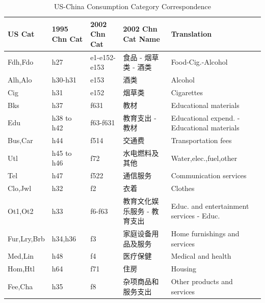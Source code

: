 \documentclass[11pt]{article}
\begin{document}
\begin{CJK}{UTF8}{gbsn}
\begin{table}
    \centering
    \footnotesize
 \begin{tabular}{lllll}
        \hline \hline
        US Cat                 & 1995 Chn Cat & 2002 Chn Cat & 2002 Chn Cat Name           & Translation \\
        \hline
        Fdh,Fdo                & h27          & e1-e152-e153 & 食品 - 烟草类 - 酒类        & Food-Cig.-Alcohol\\
        Alh,Alo                & h30-h31      & e153         & 酒类                        & Alcohol\\
        Cig                    & h31          & e152         & 烟草类                      & Cigarettes\\
        Bks                    & h37          & f631         & 教材                        & Educational materials\\
        Edu                    & h38 to h42   & f63-f631     & 教育支出 - 教材             & Educational expend. - Educational materials\\
        Bus,Car\footnotemark{} & h44          & f514         & 交通费                      & Transportation fees\\
        Utl                    & h45 to h46   & f72          & 水电燃料及其他              & Water,elec.,fuel,other\\
        Tel                    & h47          & f522         & 通信服务                    & Communication services\\
        Clo,Jwl                & h32          & f2           & 衣着                        & Clothes\\
        Ot1,Ot2                & h33          & f6-f63       & 教育文化娱乐服务 - 教育支出 & Educ. and entertainment services - Educ.\\
        Fur,Lry,Brb            & h34,h36      & f3           & 家庭设备用品及服务          & Home furnishings and services \\
        Med,Lin                & h48          & f4           & 医疗保健                    & Medical and health\\
        Hom,Htl                & h64          & f71          & 住房                        & Housing\\
        Fee,Cha                & h35          & f8           & 杂项商品和服务支出          & Other products and services \\\hline
 \end{tabular}
    \caption{US-China Consumption Category Correspondence}
    \label{tab:chncons}
\end{table}


\end{CJK}
\end{document}
